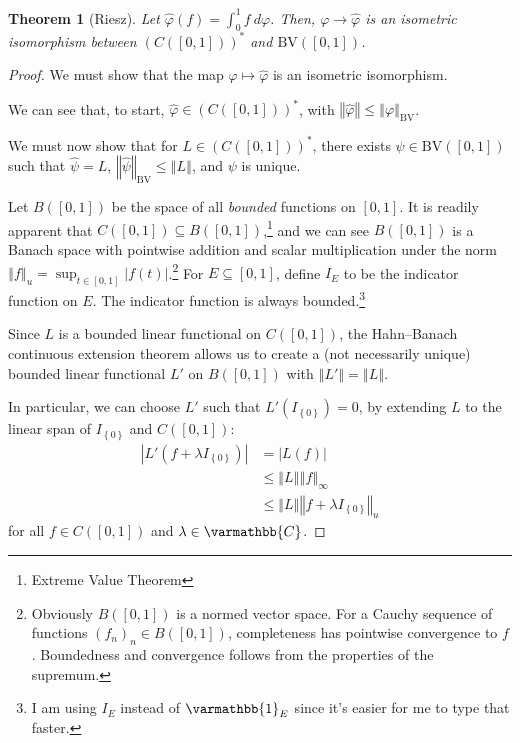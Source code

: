 \documentclass[10pt]{extarticle}
\newcommand{\C}{\mathbb{C}}
\newcommand{\norm}[1]{\left\Vert #1\right\Vert}
\newcommand{\set}[1]{\left\{#1\right\}}
\theoremstyle{plain}
\newtheorem*{theorem}{Theorem}
\theoremstyle{definition}
\theoremstyle{note}
\renewcommand*{\mathbb}[1]{\varmathbb{#1}}
\renewcommand{\newline}{\hfill\break}
\begin{document}
\begin{theorem}[Riesz]
  Let $\hat{\varphi}(f) = \int_{0}^{1}f\:d\varphi$. Then, $\varphi \rightarrow \hat{\varphi}$ is an isometric isomorphism between $\left(C\left([0,1]\right)\right)^{\ast}$ and $\text{BV}\left([0,1]\right)$.
\end{theorem}
\begin{proof}
  We must show that the map $\varphi\mapsto \hat\varphi$ is an isometric isomorphism.\newline

  We can see that, to start, $\hat\varphi \in \left(C\left([0,1]\right)\right)^{\ast}$, with $\norm{\hat{\varphi}} \leq \norm{\varphi}_{\text{BV}}$.\newline

  We must now show that for $L\in \left(C\left([0,1]\right)\right)^{\ast}$, there exists $\psi \in \text{BV}\left([0,1]\right)$ such that $\hat{\psi} = L$, $\norm{\hat{\psi}}_{\text{BV}} \leq \norm{L}$, and $\psi$ is unique.\newline

  Let $B([0,1])$ be the space of all \textit{bounded} functions on $[0,1]$. It is readily apparent that $C([0,1])\subseteq B([0,1])$,\footnote{Extreme Value Theorem} and we can see $B([0,1])$ is a Banach space with pointwise addition and scalar multiplication under the norm $\norm{f}_{u} = \sup_{t\in [0,1]}\left\vert f(t) \right\vert$.\footnote{Obviously $B([0,1])$ is a normed vector space. For a Cauchy sequence of functions $(f_n)_n\in B([0,1])$, completeness has pointwise convergence to $f$. Boundedness and convergence follows from the properties of the supremum.} For $E\subseteq [0,1]$, define $I_{E}$ to be the indicator function on $E$. The indicator function is always bounded.\footnote{I am using $I_E$ instead of $\mathbb{1}_{E}$ since it's easier for me to type that faster.}\newline

  Since $L$ is a bounded linear functional on $C([0,1])$, the Hahn--Banach continuous extension theorem allows us to create a (not necessarily unique) bounded linear functional $L'$ on $B([0,1])$ with $\norm{L'} = \norm{L}$.\newline

  In particular, we can choose $L'$ such that $L'\left(I_{\set{0}}\right) = 0$, by extending $L$ to the linear span of $I_{\set{0}}$ and $C([0,1])$:
  \begin{align*}
    \left\vert L'\left(f + \lambda I_{\set{0}}\right) \right\vert &= \left\vert L(f) \right\vert\\
                                                                  &\leq \norm{L}\norm{f}_{\infty}\\
                                                                  &\leq \norm{L}\norm{f + \lambda I_{\set{0}}}_{u}
  \end{align*}
  for all $f\in C([0,1])$ and $\lambda \in \C$.\newline


\end{proof}
\end{document}

